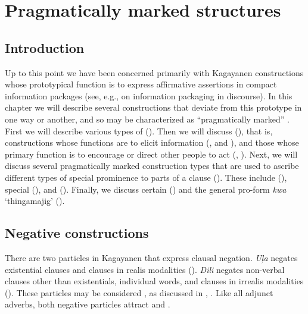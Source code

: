 \chapter{Pragmatically marked structures}
\label{chap:pragmaticallymarkedstructures}

\section{Introduction}
\label{sec:introduction-11}

Up to this point we have been concerned primarily with Kagayanen constructions whose prototypical function is to express affirmative assertions in compact information packages (see, e.g., \citealt{chafe1976} on information packaging in discourse). In this chapter we will describe several constructions that deviate from this prototype in one way or another, and so may be characterized as “pragmatically marked” \citep[261--305]{payne1997}. First we will describe various types of  (). Then we will discuss  (), that is, constructions whose functions are to elicit information (,  and ), and those whose primary function is to encourage or direct other people to act (, ). Next, we will discuss several pragmatically marked construction types that are used to ascribe different types of special prominence to parts of a clause (). These include  (), special  (), and  (). Finally, we discuss certain  () and the general pro-form \textit{kwa} ‘thingamajig’ ().

\section{Negative constructions}
\label{bkm:Ref445900201} \label{sec:negatives}
There are two particles in Kagayanen that express clausal negation. \textit{Uļa} negates existential clauses and clauses in realis modalities (). \textit{Dili} negates non-ver\-bal clauses other than existentials, individual words, and clauses in irrealis modalities (). These particles may be considered , as discussed in , . Like all adjunct adverbs, both negative particles attract  and .

